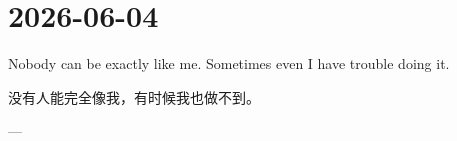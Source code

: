\section*{2026-06-04}
Nobody can be exactly like me. Sometimes even I have trouble doing it.\par
没有人能完全像我，有时候我也做不到。 \par
\hfill ---  \par
